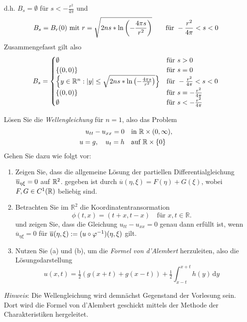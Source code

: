 \begin{exercisePage}
\begin{enumerate}[label=(\roman*), leftmargin=*]
\begin{equation*}
		\end{equation*}
		d.h. $B_s = \emptyset$ für $s < -\frac{r^2}{4\pi}$ und
		\begin{equation*}
			B_s = B_r(0) \text{ mit } r = \sqrt{2ns * \ln\left( -\frac{4\pi s}{r^2} \right)} \qquad \text{für } -\frac{r^2}{4\pi} < s < 0
		\end{equation*}
		Zusammengefasst gilt also
		\begin{equation*}
			B_s = \begin{cases}
				\emptyset & \text{für } s > 0 \\
				\left\{ (0,0) \right\} & \text{für } s = 0 \\
				\left\{ y \in \mathbb{R}^n : \left| y \right| \le \sqrt{2ns * \ln\left( -\frac{4\pi s}{r^2} \right)} \right\} & \text{für } -\frac{r^2}{4\pi} < s < 0 \\
				\left\{ (0,0) \right\} & \text{für } s = -\frac{r^2}{4\pi} \\
				\emptyset & \text{für } s < -\frac{r^2}{4\pi}
			\end{cases}
		\end{equation*}
	\end{enumerate}
	
	\begin{task}
		Lösen Sie die \textit{Wellengleichung} für $n=1$, also das Problem
		\begin{align*}
			u_{tt} - u_{xx} = 0\quad&\text{in } \mathbb{R} \times(0,\infty),\\
			u = g,\quad u_t = h\quad&\text{auf } \mathbb{R} \times \{0\}
		\end{align*}
		Gehen Sie dazu wie folgt vor:
		\begin{enumerate}
			\item Zeigen Sie, dass die allgemeine Lösung der partiellen Differentialgleichung $\overline{u}_{\eta\xi} = 0$ auf $\mathbb{R}^2$.
			gegeben ist durch $\overline{u}(\eta,\xi) = F(\eta) + G(\xi)$, wobei $F,G \in C^1(\mathbb{R})$ beliebig sind.
			\item 
			Betrachten Sie im $\mathbb{R}^2$ die Koordinatentransormation
			\begin{equation*}
				\phi(t,x) = (t + x,t - x)\quad \text{für } x,t\in \mathbb{R}.
			\end{equation*}
			und zeigen Sie, dass die Gleichung $u_{tt} - u_{xx} = 0$ genau dann erfüllt ist, wenn $\overline{u}_{\eta\xi} = 0$ für
			$\overline{u}(\eta, \xi) := (u \circ \varphi^{-1})(\eta,\xi)$ gilt.
			\item 
			Nutzen Sie (a) und (b), um die \textit{Formel von d'Alembert} herzuleiten, also die Lösungs\-darstellung
			\begin{equation*}
				u(x,t) = \tfrac12\left(g(x+t)+g(x-t)\right) + \tfrac1{2} \int_{x-t}^{x+t} h(y)\,\mathrm{d}y
			\end{equation*}
		\end{enumerate}
		\textit{Hinweis}: Die Wellengleichung wird demnächst Gegenstand der Vorlesung sein. Dort wird die Formel von d'Alembert geschickt mittels der Methode der Charakteristiken hergeleitet.
	\end{task}


\end{exercisePage}
